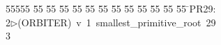 %
%
\begin{tabbing}
55555 \= 55 \= 55 \= 55 \= 55 \= 55 \= 55 \= 55 \= 55 \= 55 \= 55 \= 55 \= 55 \= \>PR29:\\[0pt]
2\>$\triangleright$\>(ORBITER)\ v\ 1\ smallest\_primitive\_root\ 29\\[0pt]
3\>\end{tabbing}
